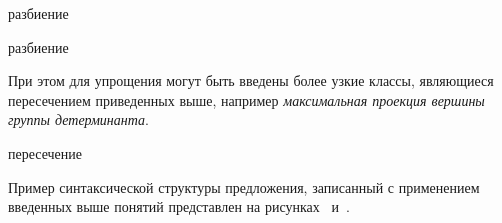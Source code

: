 \begin{SCn}
\begin{scnrelfromset}{разбиение}
\begin{scnindent}
        \end{scnindent}
    \end{scnrelfromset}
    \begin{scnrelfromset}{разбиение}
            \begin{scnindent}
            \end{scnindent}
            \begin{scnindent}
            \end{scnindent}
    \end{scnrelfromset}

\end{SCn}

При этом для упрощения могут быть введены более узкие классы, являющиеся пересечением приведенных выше, например \textit{максимальная проекция вершины группы детерминанта}.

\begin{SCn}

    \begin{scnreltoset}{пересечение}
    \end{scnreltoset}

\end{SCn}

Пример синтаксической структуры предложения, записанный с применением введенных выше понятий представлен на рисунках~\textit{} и~\textit{}.

